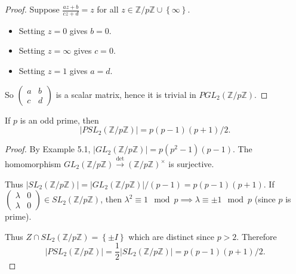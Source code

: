 \documentclass[egregdoesnotlikesansseriftitles,a4paper]{scrartcl}
\begin{document}
\begin{proof}
      Suppose $\frac{az+b}{cz+d}=z$ for all $z \in \mathbb{Z}/p\mathbb{Z} \cup \left\{ \infty\right\}$. 
      \begin{itemize}
           \item Setting $z=0$ gives $b=0$.
           \item Setting $z= \infty$ gives $c=0$.
           \item Setting $z=1$ gives $a=d$.
      \end{itemize}
      So $\begin{pmatrix} a&b\\c&d \end{pmatrix}$ is a scalar matrix, hence it is trivial in $PGL_{2}(\mathbb{Z}/p\mathbb{Z}) $.
\end{proof}
\begin{lemma}
      If $p$ is an odd prime, then \[
      |PSL_{2}(\mathbb{Z}/p\mathbb{Z})|=p (p-1)(p+1)/2
      .\] 
\end{lemma}
\begin{proof}
      By Example 5.1, $|GL_2 (\mathbb{Z}/p\mathbb{Z})|=p (p^2-1)(p-1)$. The homomorphism $GL_2 (\mathbb{Z}/p\mathbb{Z}) \xrightarrow{\operatorname{det}} (\mathbb{Z}/p\mathbb{Z})^{\times}$ is surjective.
      
      Thus $|SL_2 (\mathbb{Z}/p\mathbb{Z})|=|GL_2 (\mathbb{Z}/p\mathbb{Z})|/(p-1)=p (p-1)(p+1)$. If $\begin{pmatrix} \lambda &0 \\ \lambda&0 \end{pmatrix} \in SL_2 (\mathbb{Z}/p\mathbb{Z})$, then $\lambda^2 \equiv 1 \mod p \implies \lambda \equiv \pm 1 \mod p$ (since $p$ is prime). 

      Thus $Z \cap SL_2 (\mathbb{Z}/p\mathbb{Z})=\left\{\pm I\right\}$ which are distinct since $p>2$. Therefore \[
          |PSL_2 (\mathbb{Z}/p\mathbb{Z})|=\frac{1}{2}|SL_2 (\mathbb{Z}/p\mathbb{Z})|=p (p-1)(p+1)/2
      .\] 
\end{proof}
\end{document}

